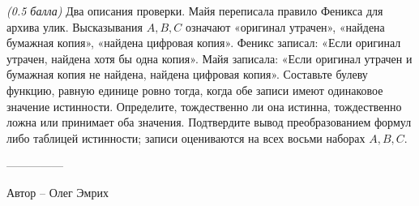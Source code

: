 \question
\textit{(0.5 балла)} Два описания проверки. Майя переписала правило Феникса для архива улик. Высказывания $A,B,C$ означают «оригинал утрачен», «найдена бумажная копия», «найдена цифровая копия». Феникс записал: «Если оригинал утрачен, найдена хотя бы одна копия». Майя записала: «Если оригинал утрачен и бумажная копия не найдена, найдена цифровая копия».
Составьте булеву функцию, равную единице ровно тогда, когда обе записи имеют одинаковое значение истинности. Определите, тождественно ли она истинна, тождественно ложна или принимает оба значения. Подтвердите вывод преобразованием формул либо таблицей истинности; записи оцениваются на всех восьми наборах $A,B,C$.

---------------

Автор -- Олег Эмрих
